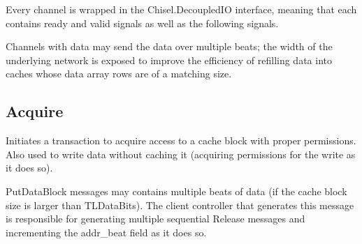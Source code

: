 Every channel is wrapped in the Chisel.DecoupledIO interface, meaning that each contains ready and valid signals as well as the following signals.

Channels with data may send the data over multiple beats; the width of the underlying network is exposed to improve the efficiency of refilling data into caches whose data array rows are of a matching size.

\subsection{Acquire}

Initiates a transaction to acquire access to a cache block with proper permissions.
Also used to write data without caching it (acquiring permissions for the write as it does so).

PutDataBlock messages may contains multiple beats of data (if the cache block size is larger than TLDataBits).
The client controller that generates this message is responsible for generating multiple sequential Release messages and incrementing the addr\_beat field as it does so.

